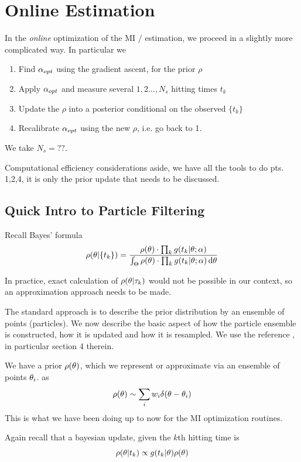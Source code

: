 \documentclass{article}
\begin{document}
\clearpage

\section{Online Estimation}
\label{sec:online_estimation} 
In the {\sl online} optimization of the MI / estimation, we proceed in a
slightly more complicated way. In particular we 

\begin{enumerate}
  \item Find ${{\alpha}_{opt} }$ using the gradient ascent, for the prior $\rho$
  \item Apply ${{\alpha}_{opt} }$ and measure several $1,2\ldots,N_{s}$ hitting times
  $t_k$
  \item Update the $\rho$ into a posterior conditional on the observed $\{t_k\}$
  \item Recalibrate ${{\alpha}_{opt} }$ using the new $\rho$, i.e. go back to 1. 
\end{enumerate}

We take $N_s= ??$. 

Computational efficiency considerations aside, we have all the tools to do pts.
1,2,4, it is only the prior update that needs to be discussed. 

\subsection{Quick Intro to Particle Filtering}
Recall Bayes' formula
$$
\rho({\theta}| \{t_k\} ) = 
\frac{  \rho({\theta}) \cdot \prod_k g(t_k|{\theta} ; {\alpha}) }
	 { \int_{\Theta}  \rho({\theta}) \cdot \prod_k g(t_k|{\theta} ; {\alpha})  \, \mathrm{d} {\theta}}
$$

In practice, exact calculation of $\rho({\theta}|{\tau}_k)$ would not be possible in our
context, so an approximation approach needs to be made.

The standard approach is to describe the prior distribution by an ensemble of
points (particles). We now describe the basic aspect of how the particle
ensemble is constructed, how it is updated and how it is resampled. We use the
reference \cite{Granade2012}, in particular section 4 therein.

We have a prior
$ \rho({\theta})$, which we represent or approximate  via an ensemble of points ${\theta}_i$. as 
$$ \rho({\theta}) \sim \sum_i w_i \delta({\theta}-{\theta}_i)$$
This is what we have been doing up to now for the MI optimization routines.

Again recall that a bayesian update, given the $k$th hitting time is
$$ \rho({\theta}|t_k) \propto g(t_k|{\theta})\rho({\theta})$$
\end{document}
